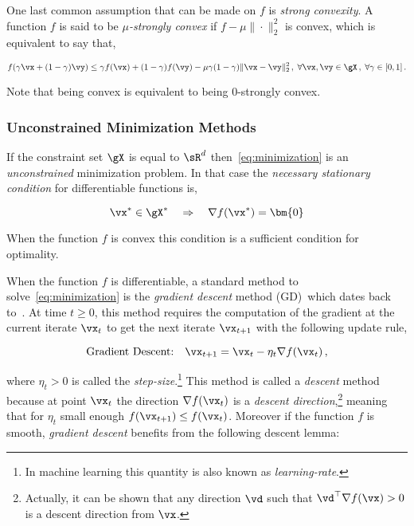 One last common assumption that can be made on $f$ is \emph{strong convexity}. A function $f$ is said to be \emph{$\mu$-strongly convex} if $f - \mu \|\cdot\|_2^2$ is convex, which is equivalent to say that,

\begin{equation} 
f(\gamma \vx + (1-\gamma) \vy) \leq \gamma f(\vx) + (1-\gamma) f(\vy) - \mu \gamma(1- \gamma)\|\vx-\vy\|_2^2
\,, \; \forall \vx, \vy \in \gX \,, \; \forall \gamma \in [0,1] \,.
\end{equation}

Note that being convex is equivalent to being $0$-strongly convex.




\subsubsection{Unconstrained Minimization Methods}




If the constraint set $\gX$ is equal to $\sR^d$ then~\eqref{eq:minimization} is an \emph{unconstrained} minimization problem. In that case the \emph{necessary stationary condition} for differentiable functions is,

\begin{equation}
\vx^* \in \gX^* \quad \Rightarrow \quad \nabla f(\vx^*) = \bm{0}
\end{equation}

When the function $f$ is convex this condition is a sufficient condition for optimality. 




When the function $f$ is differentiable, a standard method to solve~\eqref{eq:minimization} is the \emph{gradient descent} method (GD)~which dates back to~\citet{cauchy1847methode}. At time $t \geq 0$, this method requires the computation of the gradient at the current iterate $\vx_t$ to get the next iterate $\vx_{t+1}$ with the following update rule,

\begin{equation}
\text{Gradient Descent:} \quad \vx_{t+1} = \vx_t - \eta_t \nabla f(\vx_t) \,,
\end{equation}

where $\eta_t > 0$ is called the \emph{step-size}.\footnote{In machine learning this quantity is also known as \emph{learning-rate}.} This method is called a \emph{descent} method because at point $\vx_t$ the direction $\nabla f(\vx_t)$ is a \emph{descent direction},\footnote{Actually, it can be shown that any direction $\vd$ such that $\vd^\top \nabla f(\vx)>0$ is a descent direction from $\vx$.} meaning that for $\eta_t$ small enough $f(\vx_{t+1}) \leq f(\vx_t)$. Moreover if the function $f$ is smooth, \emph{gradient descent} benefits from the following descent lemma:

